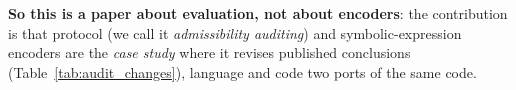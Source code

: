 \noindent\textbf{So this is a paper about evaluation, not about encoders}: the contribution is that protocol (we call it \emph{admissibility auditing}) and symbolic-expression encoders are the \emph{case study} where it revises published conclusions (Table~\ref{tab:audit_changes}), language and code two ports of the same code.



